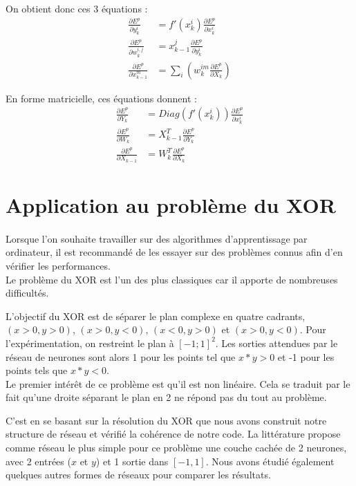 On obtient donc ces 3 équations : 
\begin{align*}
\frac{\partial E^p}{\partial y_k^i} &= f'(x_k^i)\frac{\partial E^p}{\partial x_k^i} \\
\frac{\partial E^p}{\partial w_k^{i,j}}&= x^j_{k-1} \frac{\partial E^p}{\partial y_k^i}\\
\frac{\partial E^p}{\partial x_{k-1}^m} &= \sum_i(w_k^{im}\frac{\partial E^p}{\partial X_k})
\end{align*}

En forme matricielle, ces équations donnent :
\begin{align*}
\frac{\partial E^p}{\partial Y_k} &= Diag(f'(x_k^i))\frac{\partial E^p}{\partial x_k^i} \\
\frac{\partial E^p}{\partial W_k}&= X^T_{k-1} \frac{\partial E^p}{\partial Y_k}\\
\frac{\partial E^p}{\partial X_{k-1}} &= W_k^T\frac{\partial E^p}{\partial X_k}
\end{align*}

\section{Application au problème du XOR}

\paragraph*{}
Lorsque l'on souhaite travailler sur des algorithmes d'apprentissage par ordinateur, il est recommandé de les essayer sur des problèmes connus afin d'en vérifier les performances. \\
Le problème du XOR est l'un des plus classiques car il apporte de nombreuses difficultés.

L'objectif du XOR est de séparer le plan complexe en quatre cadrants, $(x >0, y > 0)$, $ (x>0, y<0)$, $ (x<0, y>0)$ et $ (x>0, y<0) $. Pour l'expérimentation, on restreint le plan à $[-1;1]^2$. Les sorties attendues par le réseau de neurones sont alors 1 pour les points tel que $x*y > 0 $ et -1 pour les points tels que $x*y<0$. \\
Le premier intérêt de ce problème est qu'il est non linéaire. Cela se traduit par le fait qu'une droite séparant le plan en 2 ne répond pas du tout au problème.

C'est en se basant sur la résolution du XOR que nous avons construit notre structure de réseau et vérifié la cohérence de notre code. La littérature propose comme réseau le plus simple pour ce problème une couche cachée de 2 neurones, avec 2 entrées ($x$ et $y$) et 1 sortie dans $[-1, 1]$. Nous avons étudié également quelques autres formes de réseaux pour comparer les résultats.

